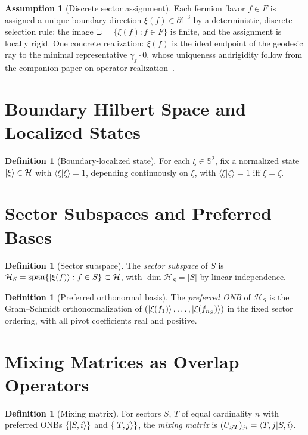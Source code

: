 ﻿\documentclass[12pt]{article}
\theoremstyle{definition}
\newtheorem{definition}[theorem]{Definition}
\newtheorem{assumption}[theorem]{Assumption}
\theoremstyle{remark}
\newcommand{\Sphere}{\mathbb{S}^2}
\newcommand{\calH}{\mathcal{H}}
\newcommand{\bdry}{\partial\mathbb{H}^3}
\newcommand{\calHS}{\mathcal{H}_S}
\begin{document}
\begin{assumption}[Discrete sector assignment]\label{ass:discrete}
Each fermion flavor $f\in F$ is assigned a unique boundary direction
$\xi(f)\in\bdry$ by a deterministic, discrete selection rule: the image
$\Xi=\{\xi(f):f\in F\}$ is finite, and the assignment is locally rigid.
One concrete realization: $\xi(f)$ is the ideal endpoint of the geodesic
ray to the minimal representative $\gamma_f\cdot0$, whose uniqueness andrigidity follow from the companion paper on operator realization~\cite{bridsonhaefliger}.
\end{assumption}

\section{Boundary Hilbert Space and Localized States}

\begin{definition}[Boundary-localized state]\label{def:localized}
For each $\xi\in\Sphere$, fix a normalized state $\ket{\xi}\in\calH$
with $\langle\xi|\xi\rangle=1$, depending continuously on $\xi$, with
$\langle\xi|\zeta\rangle=1$ iff $\xi=\zeta$.
\end{definition}

\section{Sector Subspaces and Preferred Bases}

\begin{definition}[Sector subspace]\label{def:sectorspan}
The \emph{sector subspace} of $S$ is
$\calHS=\overline{\mathrm{span}}\{\ket{\xi(f)}:f\in S\}\subset\calH$,
with $\dim\calHS=|S|$ by linear independence.
\end{definition}

\begin{definition}[Preferred orthonormal basis]\label{def:preferred}
The \emph{preferred ONB} of $\calHS$ is the Gram--Schmidt
orthonormalization of $(\ket{\xi(f_1)},\ldots,\ket{\xi(f_{n_S})})$
in the fixed sector ordering, with all pivot coefficients real and positive.
\end{definition}

\section{Mixing Matrices as Overlap Operators}

\begin{definition}[Mixing matrix]\label{def:mixing}
For sectors $S$, $T$ of equal cardinality $n$ with preferred ONBs
$\{\ket{S,i}\}$ and $\{\ket{T,j}\}$, the \emph{mixing matrix} is
$(U_{ST})_{ji}=\braket{T,j|S,i}$.
\end{definition}
\end{document}
